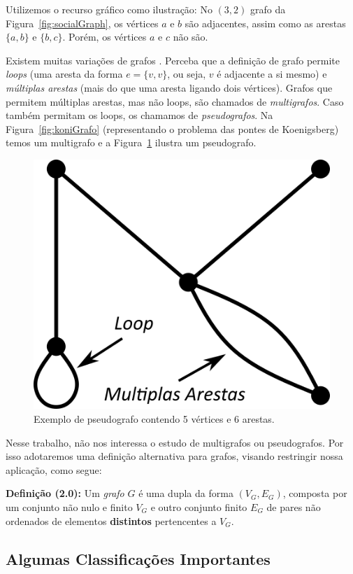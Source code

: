 \documentclass[a4paper,12pt]{article}
\begin{document}
Utilizemos o recurso gráfico como ilustração: No $(3,2)$ grafo da Figura~\ref{fig:socialGraph}, os vértices $a$ e $b$ são adjacentes, assim como as arestas $\{a, b\}$ e $\{b, c\}$. Porém, os vértices $a$ e $c$ não são.

Existem muitas variações de grafos \cite{graphTheoryFHarary}. Perceba que a definição de grafo permite \textit{loops} (uma aresta da forma $e = \{v,v\}$, ou seja, $v$ é adjacente a si mesmo) e \textit{múltiplas arestas} (mais do que uma aresta ligando dois vértices). Grafos que permitem múltiplas arestas, mas não loops, são chamados de \textit{multigrafos}. Caso também permitam os loops, os chamamos de \textit{pseudografos}. Na Figura~\ref{fig:koniGrafo} (representando o problema das pontes de Koenigsberg) temos um multigrafo e a Figura~\ref{fig:pseudograph} ilustra um pseudografo.

\begin{figure}[H]
	\begin{center}
		\includegraphics[width=0.28\linewidth]{pseudograph.png}
	\end{center}
	\caption{Exemplo de pseudografo contendo 5 vértices e 6 arestas.}
	\label{fig:pseudograph}
\end{figure}

Nesse trabalho, não nos interessa o estudo de multigrafos ou pseudografos. Por isso adotaremos uma definição alternativa para grafos, visando restringir nossa aplicação, como segue:

\begin{center}
	\begin{minipage}{0.9 \linewidth}
		\textbf{Definição (2.0):} Um \textit{grafo} $G$ é uma dupla da forma $(V_G,E_G)$, composta por um conjunto não nulo e finito $V_G$ e outro conjunto finito $E_G$ de pares não ordenados de elementos \textbf{distintos} pertencentes a $V_G$.
	\end{minipage}
\end{center} 

\subsection{Algumas Classificações Importantes}
\end{document}
